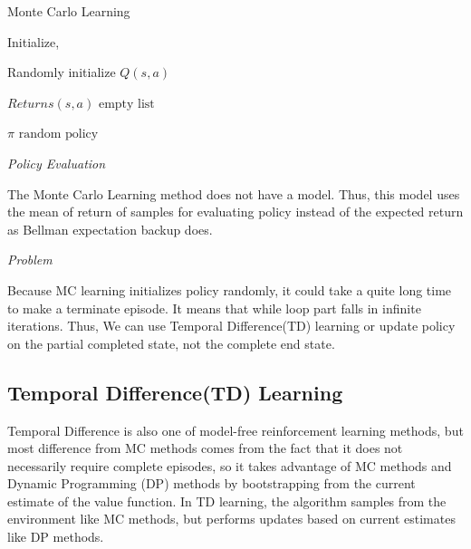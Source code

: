 \documentclass{article}
\begin{document}
\begin{algorithm}[H]
\caption{Monte Carlo Learning}\label{alg:one}
Initialize, \par
    \quad Randomly initialize $Q(s,a)$ \par
    \quad $Returns(s,a)$ \gets $\text{empty list}$ \par 
    \quad $\pi$ \gets $\text{random policy}$\par
{}
\SetAlgoLined
{}
\end{algorithm}

\textit{Policy Evaluation} \par
The Monte Carlo Learning method does not have a model. Thus, this model uses the mean of return of samples for evaluating policy instead of the expected return as Bellman expectation backup does. 


\textit{Problem} \par
Because MC learning initializes policy randomly, it could take a quite long time to make a terminate episode. It means that while loop part falls in infinite iterations.
Thus, We can use Temporal Difference(TD) learning or update policy on the partial completed state, not the complete end state.


\subsection{Temporal Difference(TD) Learning}
Temporal Difference is also one of model-free reinforcement learning methods, but most difference from MC methods comes from the fact that it does not necessarily require complete episodes, so it takes advantage of MC methods and Dynamic Programming (DP) methods by bootstrapping from the current estimate of the value function. In TD learning, the algorithm samples from the environment like MC methods, but performs updates based on current estimates like DP methods.
\end{document}
